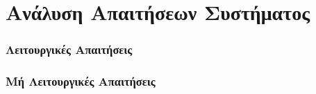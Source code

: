 \chapter{Ανάλυση Απαιτήσεων Συστήματος}

	\subsection{Λειτουργικές Απαιτήσεις}
	\subsection{Μή Λειτουργικές Απαιτήσεις}
